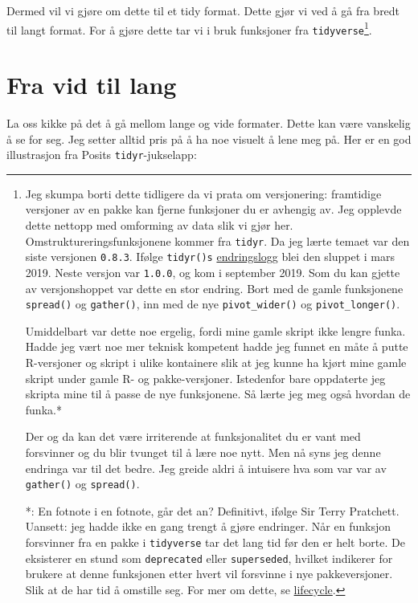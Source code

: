 \documentclass[
  letterpaper,
  DIV=11,
  numbers=noendperiod]{scrreprt}
\begin{document}
Dermed vil vi gjøre om dette til et tidy format. Dette gjør vi ved å gå
fra bredt til langt format. For å gjøre dette tar vi i bruk funksjoner
fra \texttt{tidyverse}\footnote{Jeg skumpa borti dette tidligere da vi
  prata om versjonering: framtidige versjoner av en pakke kan fjerne
  funksjoner du er avhengig av. Jeg opplevde dette nettopp med omforming
  av data slik vi gjør her. Omstruktureringsfunksjonene kommer fra
  \texttt{tidyr}. Da jeg lærte temaet var den siste versjonen
  \texttt{0.8.3}. Ifølge \texttt{tidyr()s}
  \href{https://tidyr.tidyverse.org/news/index.html\#tidyr-083}{endringslogg}
  blei den sluppet i mars 2019. Neste versjon var \texttt{1.0.0}, og kom
  i september 2019. Som du kan gjette av versjonshoppet var dette en
  stor endring. Bort med de gamle funksjonene \texttt{spread()} og
  \texttt{gather()}, inn med de nye \texttt{pivot\_wider()} og
  \texttt{pivot\_longer()}.

  Umiddelbart var dette noe ergelig, fordi mine gamle skript ikke lengre
  funka. Hadde jeg vært noe mer teknisk kompetent hadde jeg funnet en
  måte å putte R-versjoner og skript i ulike kontainere slik at jeg
  kunne ha kjørt mine gamle skript under gamle R- og pakke-versjoner.
  Istedenfor bare oppdaterte jeg skripta mine til å passe de nye
  funksjonene. Så lærte jeg meg også hvordan de funka.*

  Der og da kan det være irriterende at funksjonalitet du er vant med
  forsvinner og du blir tvunget til å lære noe nytt. Men nå syns jeg
  denne endringa var til det bedre. Jeg greide aldri å intuisere hva som
  var var av \texttt{gather()} og \texttt{spread()}.

  *: En fotnote i en fotnote, går det an? Definitivt, ifølge Sir Terry
  Pratchett. Uansett: jeg hadde ikke en gang trengt å gjøre endringer.
  Når en funksjon forsvinner fra en pakke i \texttt{tidyverse} tar det
  lang tid før den er helt borte. De eksisterer en stund som
  \texttt{deprecated} eller \texttt{superseded}, hvilket indikerer for
  brukere at denne funksjonen etter hvert vil forsvinne i nye
  pakkeversjoner. Slik at de har tid å omstille seg. For mer om dette,
  se \href{https://lifecycle.r-lib.org/articles/stages.html}{lifecycle}.}.

\hypertarget{fra-vid-til-lang}{%
\section{Fra vid til lang}\label{fra-vid-til-lang}}

La oss kikke på det å gå mellom lange og vide formater. Dette kan være
vanskelig å se for seg. Jeg setter alltid pris på å ha noe visuelt å
lene meg på. Her er en god illustrasjon fra Posits
\texttt{tidyr}-jukselapp:
\end{document}
